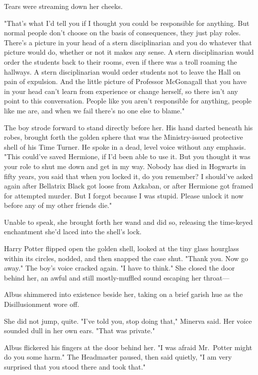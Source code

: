 Tears were streaming down her cheeks.

"That's what I'd tell you if I thought you could be responsible for anything. But normal people don't choose on the basis of consequences, they just play roles. There's a picture in your head of a stern disciplinarian and you do whatever that picture would do, whether or not it makes any sense. A stern disciplinarian would order the students back to their rooms, even if there was a troll roaming the hallways. A stern disciplinarian would order students not to leave the Hall on pain of expulsion. And the little picture of Professor McGonagall that you have in your head can't learn from experience or change herself, so there isn't any point to this conversation. People like you aren't responsible for anything, people like me are, and when we fail there's no one else to blame."

The boy strode forward to stand directly before her. His hand darted beneath his robes, brought forth the golden sphere that was the Ministry-issued protective shell of his Time Turner. He spoke in a dead, level voice without any emphasis. "This could've saved Hermione, if I'd been able to use it. But you thought it was your role to shut me down and get in my way. Nobody has died in Hogwarts in fifty years, you said that when you locked it, do you remember? I should've asked again after Bellatrix Black got loose from Azkaban, or after Hermione got framed for attempted murder. But I forgot because I was stupid. Please unlock it now before any of my other friends die."

Unable to speak, she brought forth her wand and did so, releasing the time-keyed enchantment she'd laced into the shell's lock.

Harry Potter flipped open the golden shell, looked at the tiny glass hourglass within its circles, nodded, and then snapped the case shut. "Thank you. Now go away." The boy's voice cracked again. "I have to think."
\sbreak
She closed the door behind her, an awful and still mostly-muffled sound escaping her throat---

Albus shimmered into existence beside her, taking on a brief garish hue as the Disillusionment wore off.

She did not jump, quite. "I've told you, stop doing that," Minerva said. Her voice sounded dull in her own ears. "That was private."

Albus flickered his fingers at the door behind her. "I was afraid Mr.~Potter might do you some harm." The Headmaster paused, then said quietly, "I am very surprised that you stood there and took that."

